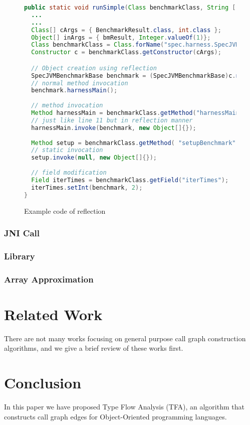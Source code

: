\documentclass{fac}
\begin{document}
\begin{figure}
\begin{lstlisting}[language={java},frame={single}]
public static void runSimple(Class benchmarkClass, String [] args) {
  ...
  ...
  Class[] cArgs = { BenchmarkResult.class, int.class };
  Object[] inArgs = { bmResult, Integer.valueOf(1)};
  Class benchmarkClass = Class.forName("spec.harness.SpecJVMBenchmarkBase");
  Constructor c = benchmarkClass.getConstructor(cArgs);

  // Object creation using reflection
  SpecJVMBenchmarkBase benchmark = (SpecJVMBenchmarkBase)c.newInstance(inArgs);
  // normal method invocation
  benchmark.harnessMain();
  
  // method invocation
  Method harnessMain = benchmarkClass.getMethod("harnessMain", new Class[]{});
  // just like line 11 but in reflection manner
  harnessMain.invoke(benchmark, new Object[]{}); 
  
  Method setup = benchmarkClass.getMethod( "setupBenchmark", new Class[]{});
  // static invocation
  setup.invoke(null, new Object[]{});
  
  // field modification
  Field iterTimes = benchmarkClass.getField("iterTimes");
  iterTimes.setInt(benchmark, 2);
}
\end{lstlisting}
\caption{Example code of reflection}
\label{fig:reflection}
\end{figure}

\subsubsection{JNI Call}\label{subsubsec:jni-call}
\subsubsection{Library}\label{subsubsec:library}
\subsubsection{Array Approximation}\label{subsubsec:array-approximation}

\section{Related Work}\label{sec:related-work}
There are not many works focusing on general purpose call graph construction algorithms, and we give a brief review of these works first.

\section{Conclusion}\label{sec:conclusion}
In this paper we have proposed Type Flow Analysis (TFA), an algorithm that constructs call graph edges for Object-Oriented programming languages.

\label{lastpage}
\end{document}

